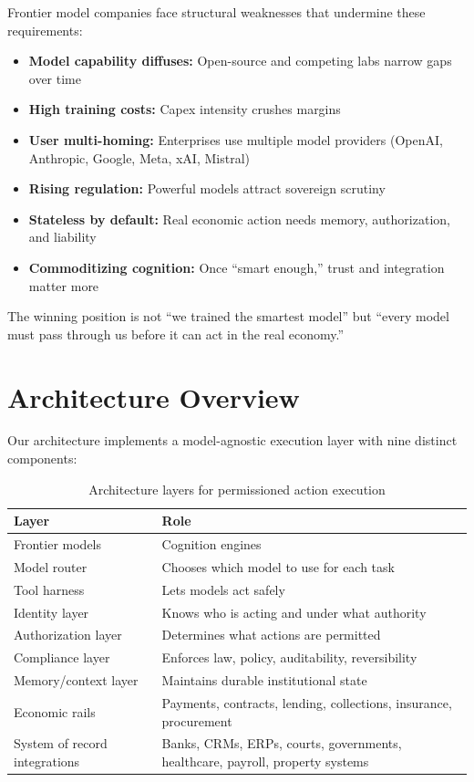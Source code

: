 \documentclass[11pt,a4paper]{article}
\begin{document}
Frontier model companies face structural weaknesses that undermine these requirements:
\begin{itemize}
    \item \textbf{Model capability diffuses:} Open-source and competing labs narrow gaps over time
    \item \textbf{High training costs:} Capex intensity crushes margins
    \item \textbf{User multi-homing:} Enterprises use multiple model providers (OpenAI, Anthropic, Google, Meta, xAI, Mistral)
    \item \textbf{Rising regulation:} Powerful models attract sovereign scrutiny
    \item \textbf{Stateless by default:} Real economic action needs memory, authorization, and liability
    \item \textbf{Commoditizing cognition:} Once ``smart enough,'' trust and integration matter more
\end{itemize}

The winning position is not ``we trained the smartest model'' but ``every model must pass through us before it can act in the real economy.''

\section{Architecture Overview}

Our architecture implements a model-agnostic execution layer with nine distinct components:

\begin{table}[h]
\centering
\begin{tabular}{ll}
\toprule
\textbf{Layer} & \textbf{Role} \\
\midrule
Frontier models & Cognition engines \\
Model router & Chooses which model to use for each task \\
Tool harness & Lets models act safely \\
Identity layer & Knows who is acting and under what authority \\
Authorization layer & Determines what actions are permitted \\
Compliance layer & Enforces law, policy, auditability, reversibility \\
Memory/context layer & Maintains durable institutional state \\
Economic rails & Payments, contracts, lending, collections, insurance, procurement \\
System of record integrations & Banks, CRMs, ERPs, courts, governments, healthcare, payroll, property systems \\
\bottomrule
\end{tabular}
\caption{Architecture layers for permissioned action execution}
\end{table}
\end{document}
